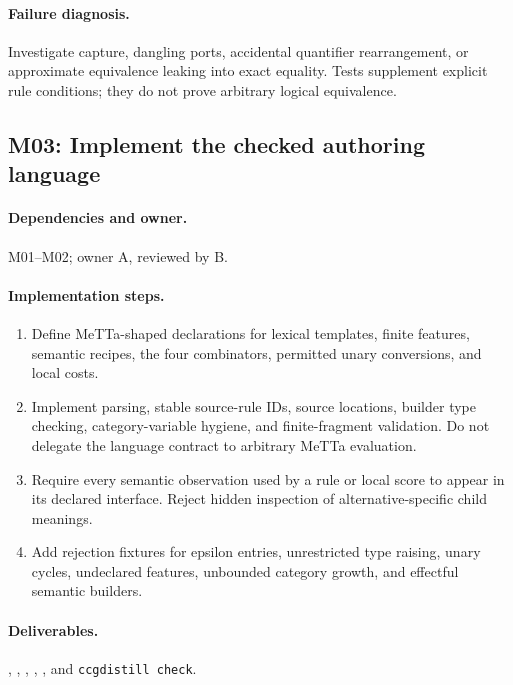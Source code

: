 \documentclass[11pt,a4paper]{article}
\begin{document}
\paragraph{Failure diagnosis.} Investigate capture, dangling ports, accidental quantifier rearrangement, or approximate equivalence leaking into exact equality. Tests supplement explicit rule conditions; they do not prove arbitrary logical equivalence.

\subsection{M03: Implement the checked authoring language}

\paragraph{Dependencies and owner.} M01--M02; owner A, reviewed by B.

\paragraph{Implementation steps.}
\begin{enumerate}
\item Define MeTTa-shaped declarations for lexical templates, finite features, semantic recipes, the four combinators, permitted unary conversions, and local costs.
\item Implement parsing, stable source-rule IDs, source locations, builder type checking, category-variable hygiene, and finite-fragment validation. Do not delegate the language contract to arbitrary MeTTa evaluation.
\item Require every semantic observation used by a rule or local score to appear in its declared interface. Reject hidden inspection of alternative-specific child meanings.
\item Add rejection fixtures for epsilon entries, unrestricted type raising, unary cycles, undeclared features, unbounded category growth, and effectful semantic builders.
\end{enumerate}

\paragraph{Deliverables.} , , , , , and \texttt{ccgdistill check}.
\end{document}
